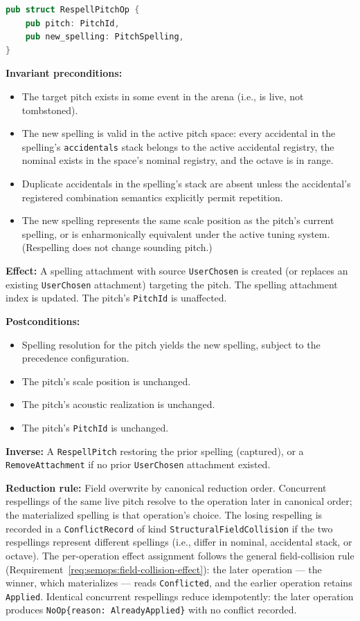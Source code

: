 \documentclass[11pt,letterpaper]{report}
\begin{document}
\begin{lstlisting}[language=Rust]
pub struct RespellPitchOp {
    pub pitch: PitchId,
    pub new_spelling: PitchSpelling,
}
\end{lstlisting}

\textbf{Invariant preconditions:}
\begin{itemize}
  \item The target pitch exists in some event in the arena (i.e.,
    is live, not tombstoned).
  \item The new spelling is valid in the active pitch space: every
    accidental in the spelling's \texttt{accidentals} stack belongs
    to the active accidental registry, the nominal exists in the
    space's nominal registry, and the octave is in range.
  \item Duplicate accidentals in the spelling's stack are absent
    unless the accidental's registered combination semantics
    explicitly permit repetition.
  \item The new spelling represents the same scale position as the
    pitch's current spelling, or is enharmonically equivalent under
    the active tuning system. (Respelling does not change sounding
    pitch.)
\end{itemize}

\textbf{Effect:} A spelling attachment with source
\texttt{UserChosen} is created (or replaces an existing
\texttt{UserChosen} attachment) targeting the pitch. The spelling
attachment index is updated. The pitch's \texttt{PitchId} is
unaffected.

\textbf{Postconditions:}
\begin{itemize}
  \item Spelling resolution for the pitch yields the new spelling,
    subject to the precedence configuration.
  \item The pitch's scale position is unchanged.
  \item The pitch's acoustic realization is unchanged.
  \item The pitch's \texttt{PitchId} is unchanged.
\end{itemize}

\textbf{Inverse:} A \texttt{RespellPitch} restoring the prior
spelling (captured), or a \texttt{RemoveAttachment} if no prior
\texttt{UserChosen} attachment existed.

\textbf{Reduction rule:} Field overwrite by canonical reduction
order. Concurrent respellings of the same live pitch resolve to the
operation later in canonical order; the materialized spelling is
that operation's choice. The losing respelling is recorded in a
\texttt{ConflictRecord} of kind
\texttt{StructuralFieldCollision} if the two respellings represent
different spellings (i.e., differ in nominal, accidental stack, or
octave). The per-operation effect assignment follows the general
field-collision rule
(Requirement~\ref{req:semops:field-collision-effect}): the later
operation --- the winner, which materializes --- reads
\texttt{Conflicted}, and the earlier operation retains
\texttt{Applied}. Identical concurrent respellings reduce
idempotently: the later operation produces
\texttt{NoOp\{reason: AlreadyApplied\}} with no conflict recorded.
\end{document}
